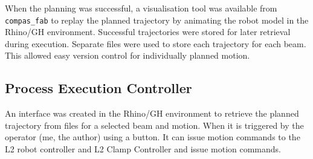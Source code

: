 When the planning was successful, a visualisation tool was available from \verb|compas_fab| to replay the planned trajectory by animating the robot model in the Rhino/GH environment. Successful trajectories were stored for later retrieval during execution. Separate files were used to store each trajectory for each beam. This allowed easy version control for individually planned motion. 

\subsection{Process Execution Controller}
\label{subsection:exploration-2-process-execution-controller}

An interface was created in the Rhino/GH environment to retrieve the planned trajectory from files for a selected beam and motion. When it is triggered by the operator (me, the author) using a button. It can issue motion commands to the L2 robot controller and L2 Clamp Controller  and issue motion commands. 
